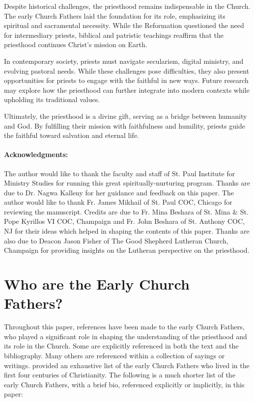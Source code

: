 \documentclass[12pt,doc]{apa7}   	%
\begin{document}
Despite historical challenges, the priesthood remains indispensable in the Church. The early Church Fathers laid the foundation for its role, emphasizing its spiritual and sacramental necessity. While the Reformation questioned the need for intermediary priests, biblical and patristic teachings reaffirm that the priesthood continues Christ’s mission on Earth.

In contemporary society, priests must navigate secularism, digital ministry, and evolving pastoral needs. While these challenges pose difficulties, they also present opportunities for priests to engage with the faithful in new ways. Future research may explore how the priesthood can further integrate into modern contexts while upholding its traditional values.

Ultimately, the priesthood is a divine gift, serving as a bridge between humanity and God. By fulfilling their mission with faithfulness and humility, priests guide the faithful toward salvation and eternal life.

\vskip 0.5cm
\paragraph{Acknowledgments:} The author would like to thank the faculty and staff of St. Paul Institute for Ministry Studies for running this great spiritually-nurturing program.  Thanks are due to Dr. Nagwa Kalleny for her guidance and feedback on this paper. The author would like to thank Fr. James Mikhail of St. Paul COC, Chicago for reviewing the manuscript. Credits are due to Fr. Mina Beshara of St. Mina \& St. Pope Kyrillos VI COC, Champaign and Fr. John Beshara of St. Anthony COC, NJ for their ideas which helped in shaping the contents of this paper. Thanks are also due to Deacon Jason Fisher of The Good Shepherd Lutheran Church, Champaign for providing insights on the Lutheran perspective on the priesthood.

\appendix{}
\section{Who are the Early Church Fathers?}\label{early_fathers}
Throughout this paper, references have been made to the early Church Fathers, who played a significant role in shaping the understanding of the priesthood and its role in the Church.  Some are explicitly referenced in both the text and the bibliography.  Many others are referenced within a collection of sayings or writings. \citet{early_church_akin} provided an exhaustive list of the early Church Fathers who lived in the first four centuries of Christianity.  The following is a much shorter list of the early Church Fathers, with a brief bio, referenced explicitly or implicitly, in this paper:
\end{document}
